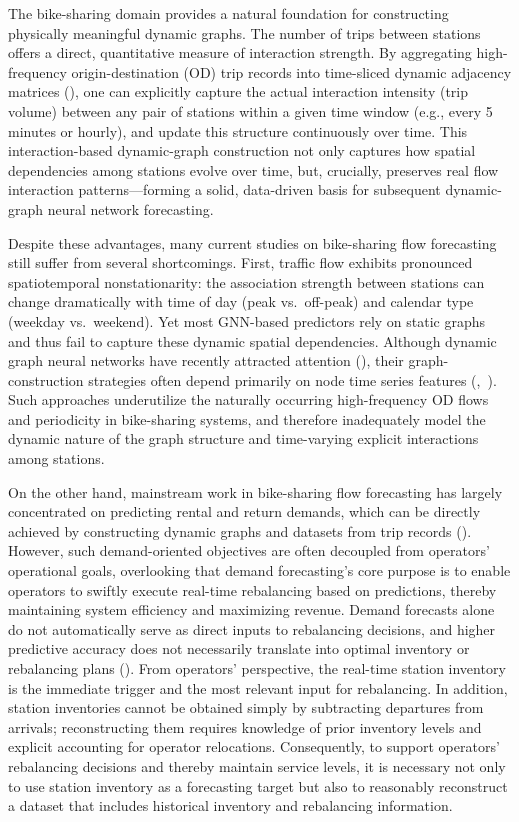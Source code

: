 \documentclass[preprint,12pt,authoryear]{elsarticle}
\begin{document}
The bike-sharing domain provides a natural foundation for constructing physically meaningful dynamic graphs. The number of trips between stations offers a direct, quantitative measure of interaction strength. By aggregating high-frequency origin-destination (OD) trip records into time-sliced dynamic adjacency matrices (\cite{feng2024spatial}), one can explicitly capture the actual interaction intensity (trip volume) between any pair of stations within a given time window (e.g., every 5 minutes or hourly), and update this structure continuously over time. This interaction-based dynamic-graph construction not only captures how spatial dependencies among stations evolve over time, but, crucially, preserves real flow interaction patterns—forming a solid, data-driven basis for subsequent dynamic-graph neural network forecasting.

Despite these advantages, many current studies on bike-sharing flow forecasting still suffer from several shortcomings. First, traffic flow exhibits pronounced spatiotemporal nonstationarity: the association strength between stations can change dramatically with time of day (peak vs.~off-peak) and calendar type (weekday vs.~weekend). Yet most GNN-based predictors rely on static graphs and thus fail to capture these dynamic spatial dependencies. Although dynamic graph neural networks have recently attracted attention (\cite{li2023dynamic}), their graph-construction strategies often depend primarily on node time series features (\cite{guo2020optimized},~\cite{li2022data}). Such approaches underutilize the naturally occurring high-frequency OD flows and periodicity in bike-sharing systems, and therefore inadequately model the dynamic nature of the graph structure and time-varying explicit interactions among stations.

On the other hand, mainstream work in bike-sharing flow forecasting has largely concentrated on predicting rental and return demands, which can be directly achieved by constructing dynamic graphs and datasets from trip records (\cite{feng2024spatial}). However, such demand-oriented objectives are often decoupled from operators' operational goals, overlooking that demand forecasting's core purpose is to enable operators to swiftly execute real-time rebalancing based on predictions, thereby maintaining system efficiency and maximizing revenue. Demand forecasts alone do not automatically serve as direct inputs to rebalancing decisions, and higher predictive accuracy does not necessarily translate into optimal inventory or rebalancing plans (\cite{gammelli2022predictive}). From operators' perspective, the real-time station inventory is the immediate trigger and the most relevant input for rebalancing. In addition, station inventories cannot be obtained simply by subtracting departures from arrivals; reconstructing them requires knowledge of prior inventory levels and explicit accounting for operator relocations. Consequently, to support operators' rebalancing decisions and thereby maintain service levels, it is necessary not only to use station inventory as a forecasting target but also to reasonably reconstruct a dataset that includes historical inventory and rebalancing information.
\end{document}
